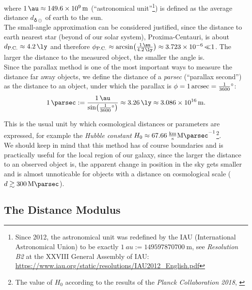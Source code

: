where $\SI{1}{\au} \approx \SI{149.6e+9}{\meter}$ (``astronomical unit''\footnote{Since 2012, the astronomical unit was redefined by the IAU (International Astronomical Union) to be exactly $\SI{1}{au} := \SI{149597870700}{\meter}$, see \textit{Resolution B2} at the XXVIII General Assembly of IAU: \href{https://www.iau.org/static/resolutions/IAU2012\_English.pdf}{https://www.iau.org/static/resolutions/IAU2012\_English.pdf}}) is defined as the average distance $d_{\earth \odot}$ of earth to the sun. \\ 
The small-angle approximation can be considered justified, since the distance to earth nearest star (beyond of our solar system), Proxima-Centauri, is about $d_{\text{P.C.}} \approx \SI{4.2}{\ly}$ and therefore $\phi_{\text{P.C.}} \approx \arcsin \bigl( \frac{\SI{1}{\au}}{\SI{4.2}{\ly}} \bigr) \approx \SI{3.723e-6} \ll 1$.
The larger the distance to the measured object, the smaller the angle is. \\
\noindent Since the parallax method is one of the most important ways to measure the distance far away objects, we define the distance of a \textit{parsec} (``parallax second'') as the distance to an object, under which the parallax is $\phi = \SI{1}{\arcsec} = \frac{1}{3600} \SI{}{\degree}$:
\begin{align}
    \SI{1}{\parsec} := \frac{\SI{1}{\au}}{\sin \bigl( \frac{1}{3600} \SI{}{\degree} \bigr)} \approx \SI{3.26}{\ly} \approx \SI{3.086e16}{\meter}.
\end{align}

\noindent This is the usual unit by which cosmological distances or parameters are expressed, for example the \textit{Hubble constant} $H_{0} \approx \SI{67.66}{\frac{\kilo \meter}{\second} \mega \parsec^{-1}}$\footnote{The value of $H_{0}$ according to the results of the \textit{Planck Collaboration 2018}, \cite[Table 7]{Planck2020} }. \\ 

\noindent We should keep in mind that this method has of course boundaries and is practically useful for the local region of our galaxy, since the larger the distance to an observed object is, the apparent change in position in the sky gets smaller and is almost unnoticable for objects with a distance on cosmological scale ($d \gtrsim \SI{300}{\mega \parsec}$). 

\subsection{The Distance Modulus}

